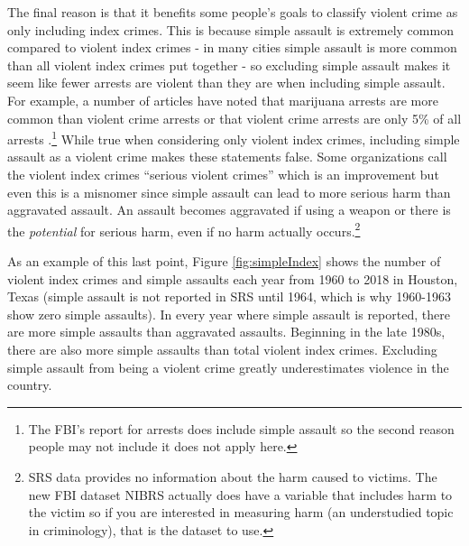 \documentclass[
]{krantz}
\begin{document}
The final reason is that it benefits some people's goals to
classify violent crime as only including index crimes. This
is because simple assault is extremely common compared to
violent index crimes - in many cities simple assault is more
common than all violent index crimes put together - so
excluding simple assault makes it seem like fewer arrests
are violent than they are when including simple assault. For
example, a number of articles have noted that marijuana
arrests are more common than violent crime arrests
\citep{ingraham2016, kertscher2019, devito2020, earlenbaugh2020, aclu2020}
or that violent crime arrests are only 5\% of all arrests
\citep{neusteter2019every, speri2019}.\footnote{The FBI's
  report for arrests does include simple assault so the
  second reason people may not include it does not apply
  here.} While true when considering only violent index
crimes, including simple assault as a violent crime makes
these statements false. Some organizations call the violent
index crimes ``serious violent crimes'' which is an
improvement but even this is a misnomer since simple assault
can lead to more serious harm than aggravated assault. An
assault becomes aggravated if using a weapon or there is the
\emph{potential} for serious harm, even if no harm actually
occurs.\footnote{SRS data provides no information about the
  harm caused to victims. The new FBI dataset NIBRS actually
  does have a variable that includes harm to the victim so
  if you are interested in measuring harm (an understudied
  topic in criminology), that is the dataset to use.}

As an example of this last point, Figure
\ref{fig:simpleIndex} shows the number of violent index
crimes and simple assaults each year from 1960 to 2018 in
Houston, Texas (simple assault is not reported in SRS until
1964, which is why 1960-1963 show zero simple assaults). In
every year where simple assault is reported, there are more
simple assaults than aggravated assaults. Beginning in the
late 1980s, there are also more simple assaults than total
violent index crimes. Excluding simple assault from being a
violent crime greatly underestimates violence in the
country.
\end{document}

